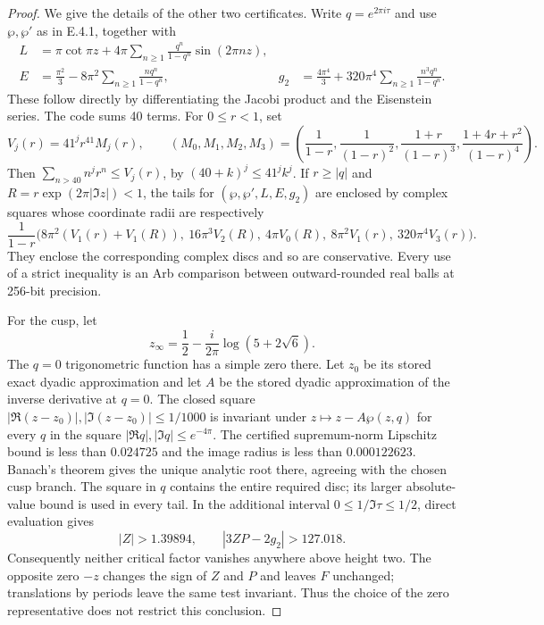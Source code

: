 \begin{proof}
We give the details of the other two certificates. Write $q=e^{2\pi
i\tau}$ and use $\wp,\wp'$ as in E.4.1, together with
\[
\begin{aligned}
 L&=\pi\cot\pi z+
       4\pi\sum_{n\geq1}\frac{q^n}{1-q^n}\sin(2\pi nz),\\
 E&=\frac{\pi^2}{3}-8\pi^2\sum_{n\geq1}\frac{nq^n}{1-q^n},&
 g_2&=\frac{4\pi^4}{3}
       +320\pi^4\sum_{n\geq1}\frac{n^3q^n}{1-q^n}.
\end{aligned}
\]
These follow directly by differentiating the Jacobi product and the
Eisenstein series. The code sums 40 terms. For $0\leq r<1$, set
\[
 V_j(r)=41^j r^{41}M_j(r),\qquad
 (M_0,M_1,M_2,M_3)=
 \left(\frac1{1-r},\frac1{(1-r)^2},
 \frac{1+r}{(1-r)^3},\frac{1+4r+r^2}{(1-r)^4}\right).
\]
Then $\sum_{n>40}n^j r^n\leq V_j(r)$, by
$(40+k)^j\leq41^jk^j$. If $r\geq|q|$ and
$R=r\exp(2\pi|\Im z|)<1$, the tails for
$(\wp,\wp',L,E,g_2)$ are enclosed by complex squares whose
coordinate radii are respectively
\[
 \frac1{1-r}\bigl(
 8\pi^2(V_1(r)+V_1(R)),\ 16\pi^3V_2(R),\
 4\pi V_0(R),\ 8\pi^2V_1(r),\ 320\pi^4V_3(r)\bigr).
\]
They enclose the corresponding complex discs and so are conservative.
Every use of a strict inequality is an Arb comparison between
outward-rounded real balls at 256-bit precision.

For the cusp, let
\[
 z_\infty=\frac12-\frac{i}{2\pi}\log(5+2\sqrt6).
\]
The $q=0$ trigonometric function has a simple zero there. Let $z_0$
be its stored exact dyadic approximation and let $A$ be the stored
dyadic approximation of the inverse derivative at $q=0$. The
closed square $|\Re(z-z_0)|,|\Im(z-z_0)|\leq1/1000$ is invariant
under $z\mapsto z-A\wp(z,q)$ for every $q$ in the square
$|\Re q|,|\Im q|\leq e^{-4\pi}$. The certified supremum-norm
Lipschitz bound is less than $0.024725$ and the image radius is less
than $0.000122623$. Banach's theorem gives the unique analytic root
there, agreeing with the chosen cusp branch. The square in $q$
contains the entire required disc; its larger absolute-value bound
is used in every tail. In the additional interval
$0\leq1/\Im\tau\leq1/2$, direct evaluation gives
\[
 |Z|>1.39894,\qquad |3ZP-2g_2|>127.018.
\]
Consequently neither critical factor vanishes anywhere above height
two. The opposite zero $-z$ changes the sign of $Z$ and $P$ and
leaves $F$ unchanged; translations by periods leave the same test
invariant. Thus the choice of the zero representative does not
restrict this conclusion.


\end{proof}
